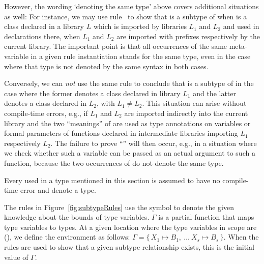 \documentclass[makeidx]{article}
\begin{document}
{{However, the wording `denoting the same type' above covers
additional situations as well:
For instance, we may use rule~\SrnReflexivity{}
to show that  is a subtype of
 when  is a class declared in a
library $L$ which is imported by libraries $L_1$ and $L_2$ and
used in declarations there,
when $L_1$ and $L_2$ are imported with prefixes
 respectively  by the current library.
The important point is that all occurrences of the same meta-variable
in a given rule instantiation stands for the same type,
even in the case where that type is not denoted by
the same syntax in both cases.

Conversely, we can \emph{not} use the same rule to conclude
that  is a subtype of 
in the case where the former denotes a class declared in library $L_1$
and the latter denotes a class declared in $L_2$, with $L_1 \not= L_2$.
This situation can arise without compile-time errors, e.g.,
if $L_1$ and $L_2$ are imported indirectly into the current library
and the two ``meanings'' of  are used
as type annotations on variables or formal parameters of functions
declared in intermediate libraries importing $L_1$ respectively $L_2$.
The failure to prove
``''
will then occur, e.g., in a situation where we check whether
such a variable can be passed as an actual argument to such a function,
because the two occurrences of  do not denote the same type.
}

\LMHash{}%
Every  used in a type mentioned in this section is assumed to
have no compile-time error and denote a type.


\LMHash{}%
The rules in Figure~\ref{fig:subtypeRules} use
the symbol \Index{$\Gamma$} to denote the given knowledge about the
bounds of type variables.
$\Gamma$ is a partial function that maps type variables to types.
At a given location where the type variables in scope are
\TypeParametersStd{}
(),
we define the environment as follows:
$\Gamma = \{\,X_1 \mapsto B_1,\ \ldots\ X_s \mapsto B_s\,\}$.
When the rules are used to show that a given subtype relationship exists,
this is the initial value of $\Gamma$.

}
\end{document}
